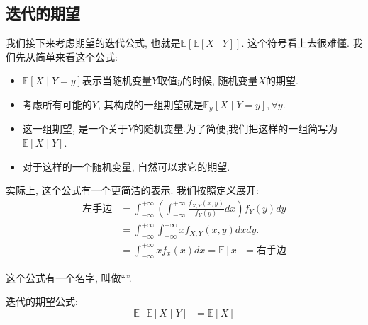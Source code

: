     \subsection{迭代的期望}

    我们接下来考虑期望的迭代公式, 也就是$\mathbb{E}[\mathbb{E}[X \mid Y]]$. 这个符号看上去很难懂. 我们先从简单来看这个公式: 
    \begin{itemize}
        \item $\mathbb{E}[X \mid Y=y]$表示当随机变量$Y$取值$y$的时候, 随机变量$X$的期望. 
        \item 考虑所有可能的$Y$, 其构成的一组期望就是$\mathbb{E}_y[X \mid Y=y], \forall y$. 
        \item 这一组期望, 是一个关于$Y$的随机变量.为了简便,我们把这样的一组简写为$\mathbb{E}[X \mid Y]$.
        \item 对于这样的一个随机变量, 自然可以求它的期望. 
    \end{itemize}

    实际上, 这个公式有一个更简洁的表示. 我们按照定义展开: 
    $$\begin{aligned} \text{左手边} & =\int_{-\infty}^{+\infty}\left(\int_{-\infty}^{+\infty} \frac{f_{X, Y}(x, y)}{f_Y(y)} d x\right) f_Y(y) d y \\ & =\int_{-\infty}^{+\infty} \int_{-\infty}^{+\infty} x f_{X, Y}(x, y) d x d y . \\ & =\int_{-\infty}^{+\infty} x f_x(x) d x=\mathbb{E}[x]=\text{右手边}\end{aligned}$$

    这个公式有一个名字, 叫做``''. 

    \begin{theorem}
        迭代的期望公式:$$
\mathbb{E}[{\mathbb{E}}[X \mid Y]]=\mathbb{E}[X]
$$
    \end{theorem}


